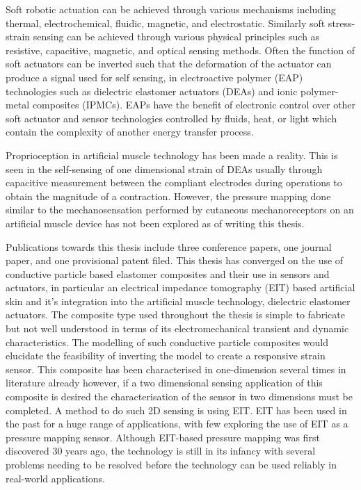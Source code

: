 
Soft robotic actuation can be achieved through various mechanisms including thermal, electrochemical, fluidic, magnetic, and electrostatic. Similarly soft stress-strain sensing can be achieved through various physical principles such as resistive, capacitive, magnetic, and optical sensing methods. Often the function of soft actuators can be inverted such that the deformation of the actuator can produce a signal used for self sensing, in electroactive polymer (EAP) technologies such as dielectric elastomer actuators (DEAs)\cite{Gisby2013, Rosset2013, Liu2016, Huang2023} and ionic polymer-metal composites (IPMCs)\cite{MohdIsa2019}. EAPs have the benefit of electronic control over other soft actuator and sensor technologies controlled by fluids, heat, or light which contain the complexity of another energy transfer process.

Proprioception in artificial muscle technology has been made a reality. This is seen in the self-sensing of one dimensional strain of DEAs usually through capacitive measurement between the compliant electrodes during operations to obtain the magnitude of a contraction. However, the pressure mapping done similar to the mechanosensation performed by cutaneous mechanoreceptors on an artificial muscle device has not been explored as of writing this thesis. 

Publications towards this thesis include three conference papers, one journal paper, and one provisional patent filed. This thesis has converged on the use of conductive particle based elastomer composites and their use in sensors and actuators, in particular an electrical impedance tomography (EIT) based artificial skin and it's integration into the artificial muscle technology, dielectric elastomer actuators. The composite type used throughout the thesis is simple to fabricate but not well understood in terms of its electromechanical transient and dynamic characteristics. The modelling of such conductive particle composites would elucidate the feasibility of inverting the model to create a responsive strain sensor. This composite has been characterised in one-dimension several times in literature already however, if a two dimensional sensing application of this composite is desired the characterisation of the sensor in two dimensions must be completed. A method to do such 2D sensing is using EIT. EIT has been used in the past for a huge range of applications, with few exploring the use of EIT as a pressure mapping sensor. Although EIT-based pressure mapping was first discovered 30 years ago, the technology is still in its infancy with several problems needing to be resolved before the technology can be used reliably in real-world applications.




